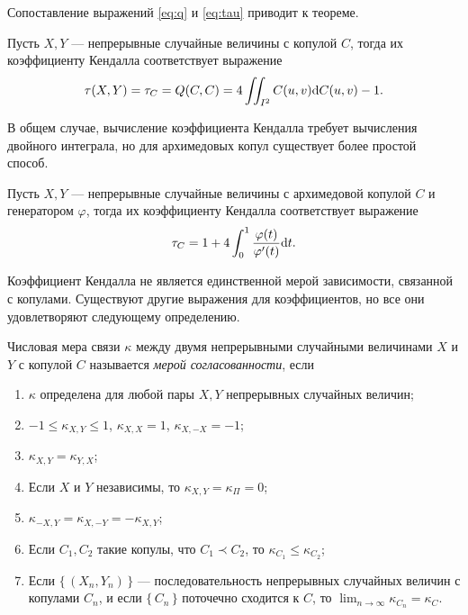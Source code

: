 Сопоставление выражений \eqref{eq:q} и \eqref{eq:tau} приводит к теореме.

\begin{theorem}
	Пусть $X, Y$ --- непрерывные случайные величины с копулой $C$, тогда их коэффициенту Кендалла соответствует выражение
	\[
	\tau(X, Y) = \tau_C = Q(C, C) = 4 \iint_{I^2} C(u, v) \mathrm{d} C(u,v) - 1.
	\]
\end{theorem}

В общем случае, вычисление коэффициента Кендалла требует вычисления двойного интеграла, но для архимедовых копул существует более простой способ.

\begin{theorem}
	Пусть $X, Y$ --- непрерывные случайные величины с архимедовой копулой $C$ и генератором $\varphi$, тогда их коэффициенту Кендалла соответствует выражение
	\[
	\tau_C = 1 + 4 \int_0^1 \frac{\varphi(t)}{\varphi'(t)} \mathrm{d} t.
	\]
\end{theorem}

Коэффициент Кендалла не является единственной мерой зависимости, связанной с копулами. Существуют другие выражения для коэффициентов, но все они удовлетворяют следующему определению.

\begin{define}
	Числовая мера связи $\kappa$ между двумя непрерывными случайными величинами $X$ и $Y$ с копулой $C$ называется \emph{мерой согласованности}, если
	\begin{enumerate}
	 	\item $\kappa$ определена для любой пары $X, Y$ непрерывных случайных величин;
	 	\item $-1 \leqslant \kappa_{X, Y} \leqslant 1$, $\kappa_{X, X} = 1$, $\kappa_{X, -X} = -1$;
	 	\item $\kappa_{X, Y} = \kappa_{Y, X}$;
	 	\item Если $X$ и $Y$ независимы, то $\kappa_{X, Y} = \kappa_\Pi = 0$;
	 	\item $\kappa_{-X, Y} = \kappa_{X, -Y} = - \kappa_{X, Y}$;
	 	\item Если $C_1, C_2$ такие копулы, что $C_1 \prec C_2$, то $\kappa_{C_1} \leqslant \kappa_{C_2}$;
	 	\item Если $\{\, (X_n, Y_n) \,\}$ --- последовательность непрерывных случайных величин с копулами $C_n$, и если $\{\, C_n \,\}$ поточечно сходится к $C$, то $\lim_{n \to \infty} \kappa_{C_n} = \kappa_C$.
	 \end{enumerate}
\end{define}

